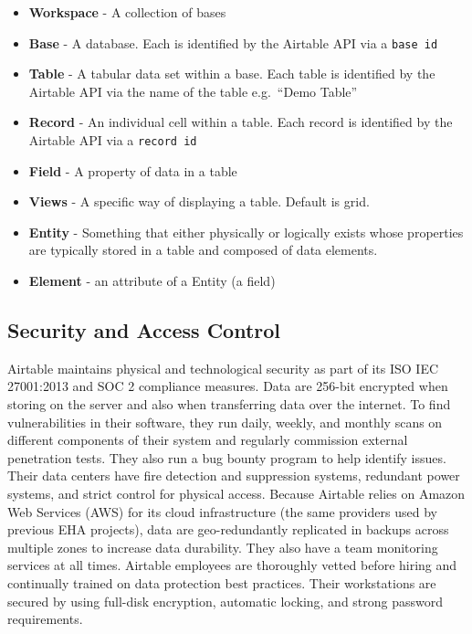 \documentclass[
]{book}
\providecommand{\tightlist}{%
  \setlength{\itemsep}{0pt}\setlength{\parskip}{0pt}}
\begin{document}
\begin{itemize}
\tightlist
\item
  \textbf{Workspace} - A collection of bases
\item
  \textbf{Base} - A database. Each is identified by the Airtable API via a \texttt{base\ id}
\item
  \textbf{Table} - A tabular data set within a base. Each table is identified by the Airtable API via the name of the table e.g.~``Demo Table''
\item
  \textbf{Record} - An individual cell within a table. Each record is identified by the Airtable API via a \texttt{record\ id}
\item
  \textbf{Field} - A property of data in a table
\item
  \textbf{Views} - A specific way of displaying a table. Default is grid.
\item
  \textbf{Entity} - Something that either physically or logically exists whose properties are typically stored in a table and composed of data elements.
\item
  \textbf{Element} - an attribute of a Entity (a field)
\end{itemize}

\hypertarget{security-and-access-control}{%
\subsection{Security and Access Control}\label{security-and-access-control}}

Airtable maintains physical and technological security as part of its ISO IEC 27001:2013 and SOC 2 compliance measures. Data are 256-bit encrypted when storing on the server and also when transferring data over the internet. To find vulnerabilities in their software, they run daily, weekly, and monthly scans on different components of their system and regularly commission external penetration tests. They also run a bug bounty program to help identify issues. Their data centers have fire detection and suppression systems, redundant power systems, and strict control for physical access. Because Airtable relies on Amazon Web Services (AWS) for its cloud infrastructure (the same providers used by previous EHA projects), data are geo-redundantly replicated in backups across multiple zones to increase data durability. They also have a team monitoring services at all times. Airtable employees are thoroughly vetted before hiring and continually trained on data protection best practices. Their workstations are secured by using full-disk encryption, automatic locking, and strong password requirements.
\end{document}
